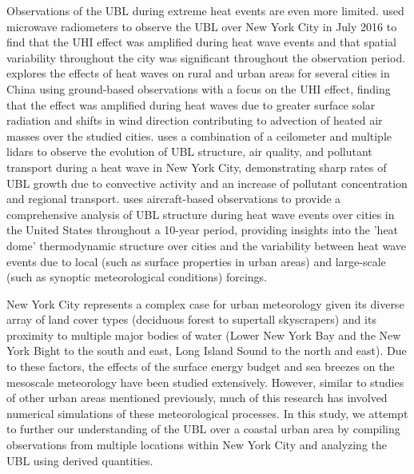 \documentclass[11pt,a4paper]{article}
\begin{document}
Observations of the UBL during extreme heat events are even more limited. \citet{ramamurthy2017} used microwave radiometers to observe the UBL over New York City in July 2016 to find that the UHI effect was amplified during heat wave events and that spatial variability throughout the city was significant throughout the observation period. \citet{jiang2019} explores the effects of heat waves on rural and urban areas for several cities in China using ground-based observations with a focus on the UHI effect, finding that the effect was amplified during heat waves due to greater surface solar radiation and shifts in wind direction contributing to advection of heated air masses over the studied cities. \citep{wu2019} uses a combination of a ceilometer and multiple lidars to observe the evolution of UBL structure, air quality, and pollutant transport during a heat wave in New York City, demonstrating sharp rates of UBL growth due to convective activity and an increase of pollutant concentration and regional transport. \citet{zhang2020} uses aircraft-based observations to provide a comprehensive analysis of UBL structure during heat wave events over cities in the United States throughout a 10-year period, providing insights into the 'heat dome' thermodynamic structure over cities and the variability between heat wave events due to local (such as surface properties in urban areas) and large-scale (such as synoptic meteorological conditions) forcings. 


New York City represents a complex case for urban meteorology given its diverse array of land cover types (deciduous forest to supertall skyscrapers) and its proximity to multiple major bodies of water (Lower New York Bay and the New York Bight to the south and east, Long Island Sound to the north and east). Due to these factors, the effects of the surface energy budget \citep{hrisko2021, ramamurthy2014, tewari2019} and sea breezes \citep{childs2005, colle2010, frizzola1963, gedzelman2003, melecio2018, thompson2007} on the mesoscale meteorology have been studied extensively. However, similar to studies of other urban areas mentioned previously, much of this research has involved numerical simulations of these meteorological processes. In this study, we attempt to further our understanding of the UBL over a coastal urban area by compiling observations from multiple locations within New York City and analyzing the UBL using derived quantities.
\end{document}

